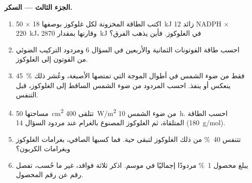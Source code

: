 \begin{problem}
\medskip
\noindent\textbf{الجزء الثالث --- السكر.}
\begin{enumerate}[resume]
  \item اكتب الطاقة المخزونة لكل غلوكوز بوصفها 18  $\times$
        \qty{50}{kJ} زائد 12 NADPH $\times$ \qty{220}{kJ}، وقارنها
        بمقدار \qty{2870}{kJ} في الغلوكوز. فأين يذهب الفرق؟
  \item احسب طاقة الفوتونات الثمانية والأربعين في السؤال 6 ومردود
        التركيب الضوئي من الفوتون إلى الغلوكوز.
  \item \qty{45}{\%} فقط من ضوء الشمس في أطوال الموجة التي تمتصها
        الأصبغة، وعُشر ذلك ينعكس أو ينفذ. احسب المردود من ضوء الشمس
        الساقط إلى الغلوكوز، قبل التنفس.
  \item {} مساحتها \qty{50}{cm^2} تتلقى \qty{400}{W/m^2} من ضوء
        الشمس \qty{10}{h}. احسب الطاقة المتلقاة، ثم الغلوكوز المصنوع
        بالغرام عند مردود السؤال 14 (\qty{180}{g/mol}).
  \item تتنفس  \qty{40}{\%} من ذلك الغلوكوز لتبقى حية. فما
        كسبها الصافي، بغرامات الغلوكوز وبغرامات الكربون؟
  \item يبلغ محصول \qty{1}{\%} مردودًا إجماليًا في موسم. اذكر ثلاثة
        فواقد، غير ما حُسب، تفصل رقم  عن رقم المحصول.
\end{enumerate}


\end{problem}

